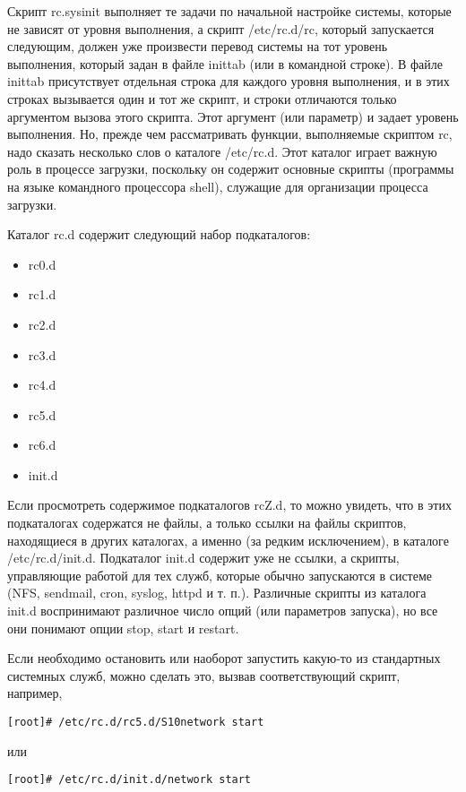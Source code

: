 Скрипт rc.sysinit выполняет те задачи по начальной настройке системы, которые не зависят от уровня выполнения, а скрипт /etc/rc.d/rc, который запускается следующим, должен уже произвести перевод системы на тот уровень выполнения, который задан в файле inittab (или в командной строке). В файле inittab присутствует отдельная строка для каждого уровня выполнения, и в этих строках вызывается один и тот же скрипт, и строки отличаются только аргументом вызова этого скрипта. Этот аргумент (или параметр) и задает уровень выполнения. Но, прежде чем рассматривать функции, выполняемые скриптом rc, надо сказать несколько слов о каталоге /etc/rc.d. Этот каталог играет важную роль в процессе загрузки, поскольку он содержит основные скрипты (программы на языке командного процессора shell), служащие для организации процесса загрузки.

Каталог rc.d содержит следующий набор подкаталогов:
\begin{itemize}
\item rc0.d
\item rc1.d
\item rc2.d
\item rc3.d
\item rc4.d
\item rc5.d
\item rc6.d
\item init.d
\end{itemize}

Если просмотреть содержимое подкаталогов rcZ.d, то можно увидеть, что в этих подкаталогах содержатся не файлы, а только ссылки на файлы скриптов, находящиеся в других каталогах, а именно (за редким исключением), в каталоге /etc/rc.d/init.d. Подкаталог init.d содержит уже не ссылки, а скрипты, управляющие работой для тех служб, которые обычно запускаются в системе (NFS, sendmail, cron, syslog, httpd и т. п.). Различные скрипты из каталога init.d воспринимают различное число опций (или параметров запуска), но все они понимают опции stop, start и restart.

Если необходимо остановить или наоборот запустить какую-то из стандартных системных служб, можно сделать это, вызвав соответствующий скрипт, например,

\begin{Verbatim}[frame=single]
[root]# /etc/rc.d/rc5.d/S10network start
\end{Verbatim}

или

\begin{Verbatim}[frame=single]
[root]# /etc/rc.d/init.d/network start
\end{Verbatim}

